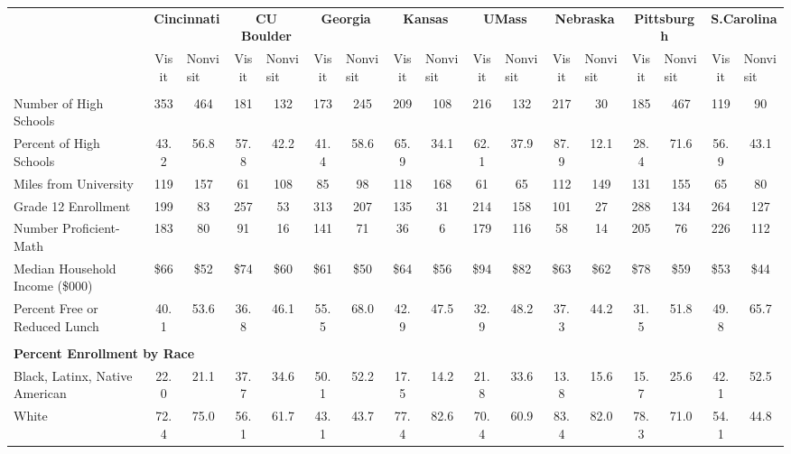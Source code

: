 \begin{tabular*}{\linewidth}{@{\extracolsep{\fill} } lcccccccccccccccc}%
&\multicolumn{2}{c}{\bfseries Cincinnati}&\multicolumn{2}{c}{\bfseries CU Boulder}&\multicolumn{2}{c}{\bfseries Georgia}&\multicolumn{2}{c}{\bfseries Kansas}&\multicolumn{2}{c}{\bfseries UMass}&\multicolumn{2}{c}{\bfseries Nebraska}&\multicolumn{2}{c}{\bfseries Pittsburgh}&\multicolumn{2}{c}{\bfseries S.Carolina}\\%
&Visit&\multicolumn{1}{l}{Nonvisit}&Visit&\multicolumn{1}{l}{Nonvisit}&Visit&\multicolumn{1}{l}{Nonvisit}&Visit&\multicolumn{1}{l}{Nonvisit}&Visit&\multicolumn{1}{l}{Nonvisit}&Visit&\multicolumn{1}{l}{Nonvisit}&Visit&\multicolumn{1}{l}{Nonvisit}&Visit&\multicolumn{1}{l}{Nonvisit}\\%
\hline%
&&&&&&&&&&&&&&&&\\%
\hspace{0cm}Number of High Schools&353&464&181&132&173&245&209&108&216&132&217&30&185&467&119&90\\%
Percent of High Schools&43.2&56.8&57.8&42.2&41.4&58.6&65.9&34.1&62.1&37.9&87.9&12.1&28.4&71.6&56.9&43.1\\%
\hspace{0cm}Miles from University&119&157&61&108&85&98&118&168&61&65&112&149&131&155&65&80\\%
\hspace{0cm}Grade 12 Enrollment&199&83&257&53&313&207&135&31&214&158&101&27&288&134&264&127\\%
\hspace{0cm}Number Proficient{-}Math&183&80&91&16&141&71&36&6&179&116&58&14&205&76&226&112\\%
\hspace{0cm}Median Household Income (\$000)&\$66&\$52&\$74&\$60&\$61&\$50&\$64&\$56&\$94&\$82&\$63&\$62&\$78&\$59&\$53&\$44\\%
\hspace{0cm}Percent Free or Reduced Lunch&40.1&53.6&36.8&46.1&55.5&68.0&42.9&47.5&32.9&48.2&37.3&44.2&31.5&51.8&49.8&65.7\\%
&&&&&&&&&&&&&&&&\\%
\multicolumn{17}{l}{\bfseries Percent Enrollment by Race}\\%
\hspace{0.2cm}Black, Latinx, Native American&22.0&21.1&37.7&34.6&50.1&52.2&17.5&14.2&21.8&33.6&13.8&15.6&15.7&25.6&42.1&52.5\\%
\hspace{0.2cm}White&72.4&75.0&56.1&61.7&43.1&43.7&77.4&82.6&70.4&60.9&83.4&82.0&78.3&71.0&54.1&44.8\\%

\end{tabular*}
